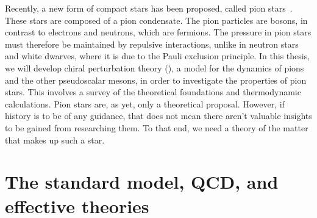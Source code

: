 Recently, a new form of compact stars has been proposed, called pion stars~\autocite{andersenBoseEinsteinCondensationPion2018,brandtNewClassCompact2018,carignanoScrutinizingPionCondensed2017}.
These stars are composed of a pion condensate.
The pion particles are bosons, in contrast to electrons and neutrons, which are fermions.
The pressure in pion stars must therefore be maintained by repulsive interactions, unlike in neutron stars and white dwarves, where it is due to the Pauli exclusion principle.
In this thesis, we will develop chiral perturbation theory (\chpt), a model for the dynamics of pions and the other pseudoscalar mesons, in order to investigate the properties of pion stars.
This involves a survey of the theoretical foundations and thermodynamic calculations.
Pion stars are, as yet, only a theoretical proposal.
However, if history is to be of any guidance, that does not mean there aren't valuable insights to be gained from researching them.
To that end, we need a theory of the matter that makes up such a star.




\section{The standard model, QCD, and effective theories}



